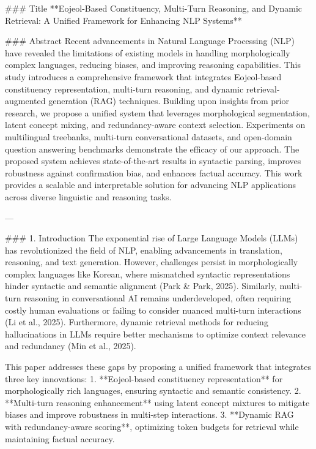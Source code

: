 ### Title
**Eojeol-Based Constituency, Multi-Turn Reasoning, and Dynamic Retrieval: A Unified Framework for Enhancing NLP Systems**

### Abstract
Recent advancements in Natural Language Processing (NLP) have revealed the limitations of existing models in handling morphologically complex languages, reducing biases, and improving reasoning capabilities. This study introduces a comprehensive framework that integrates Eojeol-based constituency representation, multi-turn reasoning, and dynamic retrieval-augmented generation (RAG) techniques. Building upon insights from prior research, we propose a unified system that leverages morphological segmentation, latent concept mixing, and redundancy-aware context selection. Experiments on multilingual treebanks, multi-turn conversational datasets, and open-domain question answering benchmarks demonstrate the efficacy of our approach. The proposed system achieves state-of-the-art results in syntactic parsing, improves robustness against confirmation bias, and enhances factual accuracy. This work provides a scalable and interpretable solution for advancing NLP applications across diverse linguistic and reasoning tasks.

---

### 1. Introduction  
The exponential rise of Large Language Models (LLMs) has revolutionized the field of NLP, enabling advancements in translation, reasoning, and text generation. However, challenges persist in morphologically complex languages like Korean, where mismatched syntactic representations hinder syntactic and semantic alignment (Park & Park, 2025). Similarly, multi-turn reasoning in conversational AI remains underdeveloped, often requiring costly human evaluations or failing to consider nuanced multi-turn interactions (Li et al., 2025). Furthermore, dynamic retrieval methods for reducing hallucinations in LLMs require better mechanisms to optimize context relevance and redundancy (Min et al., 2025).  

This paper addresses these gaps by proposing a unified framework that integrates three key innovations:  
1. **Eojeol-based constituency representation** for morphologically rich languages, ensuring syntactic and semantic consistency.  
2. **Multi-turn reasoning enhancement** using latent concept mixtures to mitigate biases and improve robustness in multi-step interactions.  
3. **Dynamic RAG with redundancy-aware scoring**, optimizing token budgets for retrieval while maintaining factual accuracy.  

